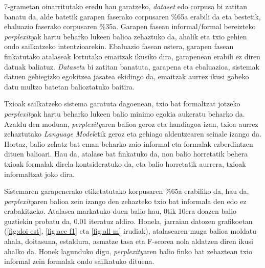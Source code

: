 \documentclass[information,article,submit,moreauthors,pdftex,10pt,a4paper]{Definitions/mdpi}
\begin{document}
7-grametan oinarritutako eredu hau garatzeko, \textit{dataset} edo corpusa bi zatitan banatu da, alde batetik garapen faserako corpusaren \%65a erabili da eta bestetik, ebaluazio faserako corpusaren \%35a. Garapen fasean informal/formal bereizteko \textit{perplexity}ak hartu beharko lukeen balioa zehaztuko da, ahalik eta txio gehien ondo sailkatzeko intentzioarekin. Ebaluazio fasean ostera, garapen fasean finkatutako atalaseak lortutako emaitzak ikusiko dira, garapenean erabili ez diren datuak baliatuz. \textit{Dataset}a bi zatitan banatuta, garapena eta ebaluazioa, sistemak datuen gehiegizko egokitzea jasatea ekidingo da, emaitzak aurrez ikusi gabeko datu multzo batetan balioztatuko baitira.


Txioak sailkatzeko sistema garatuta dagoenean, txio bat formaltzat jotzeko \textit{perplexity}ak hartu beharko lukeen balio minimo egokia aukeratu beharko da. Azaldu den moduan, \textit{perplexity}aren balioa geroz eta handiagoa izan, txioa aurrez zehaztutako \textit{Language Model}etik geroz eta gehiago aldentzearen seinale izango da. Hortaz, balio zehatz bat eman beharko zaio informal eta formalak ezberdintzen dituen balioari. Hau da, atalase bat finkatuko da, non balio horretatik behera txioak formalak direla kontsideratuko da, eta balio horretatik aurrera, txioak informaltzat joko dira.

Sistemaren garapenerako etiketatutako korpusaren \%65a erabiliko da, hau da, \textit{perplexity}aren balioa zein izango den zehazteko txio bat informala den edo ez erabakitzeko. Atalasea markatuko duen balio hau, 0tik 10era doazen balio guztiekin probatu da, 0.01 iteratuz aldiro. Honela, jarraian datozen grafikoetan (\ref{fig:doi est}, \ref{fig:acc f1} eta \ref{fig:all m} irudiak), atalasearen muga balioa moldatu ahala, doitasuna, estaldura, asmatze tasa eta F-scorea nola aldatzen diren ikusi ahalko da. Honek lagunduko digu, \textit{perplexity}aren balio finko bat zehaztean txio informal zein formalak ondo sailkatuko dituena.
\end{document}
